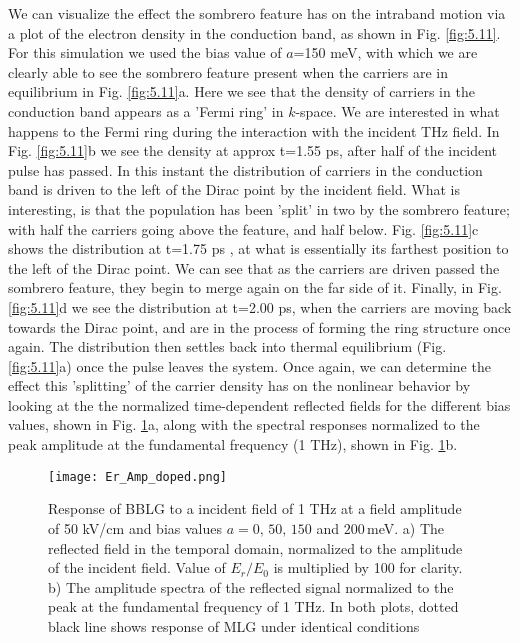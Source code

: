 \documentclass[twocolumn,secnumarabic,amssymb, nobibnotes, aps, prd, superscriptaddress]{revtex4-1}
\begin{document}
We can visualize the effect the sombrero feature has on the intraband motion via a plot of the electron density in the conduction band, as shown in Fig. \ref{fig:5.11}. For this simulation we used the bias value of $a$=150 meV, with which we are clearly able to see the sombrero feature present when the carriers are in equilibrium in Fig.  \ref{fig:5.11}a. Here we see that the density of carriers in the conduction band appears as a 'Fermi ring' in $k$-space. We are interested in what happens to the Fermi ring during the interaction with the incident THz field. In Fig.  \ref{fig:5.11}b we see the density at approx t=1.55 ps, after half of the incident pulse has passed. In this instant the distribution of carriers in the conduction band is driven to the left of the Dirac point by the incident field. What is interesting, is that the population has been 'split' in two by the sombrero feature; with half the carriers going above the feature, and half below. Fig.  \ref{fig:5.11}c shows the distribution at t=1.75 ps , at what is essentially its farthest position to the left of the Dirac point. We can see that as the carriers are driven passed the sombrero feature, they begin to merge again on the far side of it. Finally, in Fig.  \ref{fig:5.11}d we see the distribution at t=2.00 ps, when the carriers are moving back towards the Dirac point, and are in the process of forming the ring structure once again. The distribution then settles back into thermal equilibrium (Fig.  \ref{fig:5.11}a) once the pulse leaves the system. Once again, we can determine the effect this 'splitting' of the carrier density has on the nonlinear behavior by looking at the the normalized time-dependent reflected fields for the different bias values, shown in Fig.  \ref{fig:5.12}a, along with the spectral responses normalized to the peak amplitude at the fundamental frequency (1 THz), shown in Fig.  \ref{fig:5.12}b. 


\begin{figure}
\centering
\texttt{[image: Er\_Amp\_doped.png]}
\caption{Response of BBLG to a incident field of 1 THz at a field amplitude of 50 kV/cm and bias values $a=0,\,50,\,150$ and $200\,$meV. a) The reflected field in the temporal domain, normalized to the amplitude of the incident field. Value of $E_r/E_0$ is multiplied by 100 for clarity. b) The amplitude spectra of the reflected signal normalized to the peak at the fundamental frequency of 1 THz. In both plots, dotted black line shows response of MLG under identical conditions}\label{fig:5.12}
\end{figure}
\end{document}
